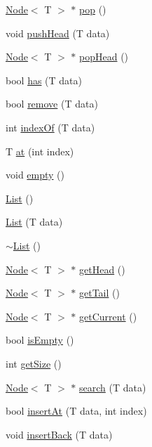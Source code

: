 \begin{DoxyCompactItemize}
\item 
\hyperlink{class_node}{Node}$<$ T $>$ $\ast$ \hyperlink{class_list_a985cb6f2b506e9d30e8fa59b39d44efd}{pop} ()
\item 
void \hyperlink{class_list_a52150cf0b88cd75787c64753add000ae}{push\+Head} (T data)
\item 
\hyperlink{class_node}{Node}$<$ T $>$ $\ast$ \hyperlink{class_list_ae216f7a997b0c9fc0e1d89f241b9f5b2}{pop\+Head} ()
\item 
bool \hyperlink{class_list_a1af3f7dea5bb7e693675795312256f71}{has} (T data)
\item 
bool \hyperlink{class_list_a104d8a6b2b3f64149acb31c2e3073bed}{remove} (T data)
\item 
int \hyperlink{class_list_a94c0b5278992ef8d6830a14732157440}{index\+Of} (T data)
\item 
T \hyperlink{class_list_ab96ccb71dbe8292d4a4e64c73fb03ff0}{at} (int index)
\item 
void \hyperlink{class_list_a34bb861c7093434bc48473a20cf7b157}{empty} ()
\item 
\hyperlink{class_list_a5c5e27671b21b3815d4e25b953c69454}{List} ()
\item 
\hyperlink{class_list_a054ab94d95915e2a3b8945cbdf51a42b}{List} (T data)
\item 
\hyperlink{class_list_a2b58189090f6e5ce52939c9195e59e85}{$\sim$\+List} ()
\item 
\hyperlink{class_node}{Node}$<$ T $>$ $\ast$ \hyperlink{class_list_a786c0ed42a576a1c56b20ab892f51d27}{get\+Head} ()
\item 
\hyperlink{class_node}{Node}$<$ T $>$ $\ast$ \hyperlink{class_list_aeadc86b707f794159f58a63aadd43947}{get\+Tail} ()
\item 
\hyperlink{class_node}{Node}$<$ T $>$ $\ast$ \hyperlink{class_list_a53de13994a40e64c7ded3937d519c991}{get\+Current} ()
\item 
bool \hyperlink{class_list_a73f8b1d313382daffeeeed552f42da2f}{is\+Empty} ()
\item 
int \hyperlink{class_list_ae2afa15a07b88a3a678969522cc14988}{get\+Size} ()
\item 
\hyperlink{class_node}{Node}$<$ T $>$ $\ast$ \hyperlink{class_list_af6e64cae6cfa23efd13be7c1ee1bff75}{search} (T data)
\item 
bool \hyperlink{class_list_a62f806c2e345baff40798902f98722f3}{insert\+At} (T data, int index)
\item 
void \hyperlink{class_list_ab6b782189c3b9d5bd184428e7089576f}{insert\+Back} (T data)
\item 

\end{DoxyCompactItemize}
